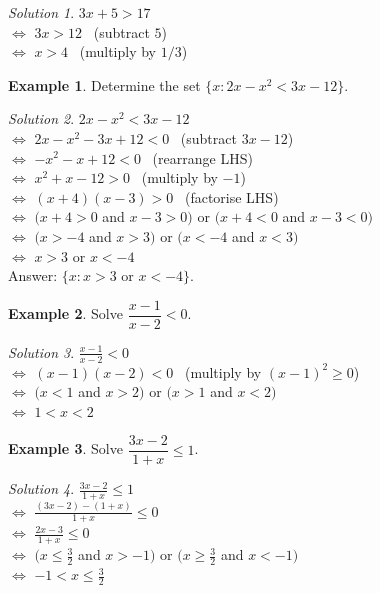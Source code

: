 \documentclass[
  12pt,
  oneside]{book}
\theoremstyle{definition}
\theoremstyle{definition}
\newtheorem{example}{Example}[chapter]
\theoremstyle{definition}
\theoremstyle{definition}
\theoremstyle{remark}
\newtheorem*{solution}{Solution}
\begin{document}
\begin{solution}
\(3x+5>17\)\\
\(\iff\) \(3x>12\) \hfill~{(subtract \(5\))}\\
\(\iff\) \(x>4\) \hfill~{(multiply by \(1/3\))}
\end{solution}

\begin{example}
Determine the set \(\{x: 2x-x^2<3x-12\}\).
\end{example}

\begin{solution}
\(2x-x^2<3x-12\)\\
\(\iff\) \(2x-x^2-3x+12<0\) \hfill~{(subtract \(3x-12\))}\\
\(\iff\) \(-x^2-x+12<0\) \hfill~{(rearrange LHS)}\\
\(\iff\) \(x^2+x-12>0\) \hfill~{(multiply by \(-1\))}\\
\(\iff\) \((x+4)(x-3)>0\) \hfill~{(factorise LHS)}\\
\(\iff\) \(\big( x+4>0\) and \(x-3>0\big)\) or \(\big(x+4<0\) and \(x-3<0\big)\)\\
\(\iff\) \(\big( x>-4\) and \(x>3\big)\) or \(\big(x<-4\) and \(x<3\big)\)\\
\(\iff\) \(x>3\) or \(x<-4\)\\
Answer: \(\{x: x>3\text{ or }x<-4\}\).
\end{solution}

\begin{example}
Solve \(\dfrac{x-1}{x-2}<0\).
\end{example}

\begin{solution}
\(\frac{x-1}{x-2}<0\)\\
\(\iff\) \((x-1)(x-2)<0\) \hfill~{(multiply by \((x-1)^2\geq 0\))}\\
\(\iff\) \(\big( x<1\) and \(x>2\big)\) or \(\big(x>1\) and \(x<2\big)\)\\
\(\iff\) \(1<x<2\)
\end{solution}

\begin{example}
Solve \(\dfrac{3x-2}{1+x}\leq 1\).
\end{example}

\begin{solution}
\(\frac{3x-2}{1+x}\leq1\)\\
\(\iff\) \(\frac{(3x-2)-(1+x)}{1+x}\leq0\)\\
\(\iff\) \(\frac{2x-3}{1+x}\leq0\)\\
\(\iff\) \(\big( x\leq\frac{3}{2}\) and \(x>-1\big)\) or \(\big(x\geq \frac{3}{2}\) and \(x<-1\big)\)\\
\(\iff\) \(-1<x\leq\frac{3}{2}\)
\end{solution}
\end{document}
